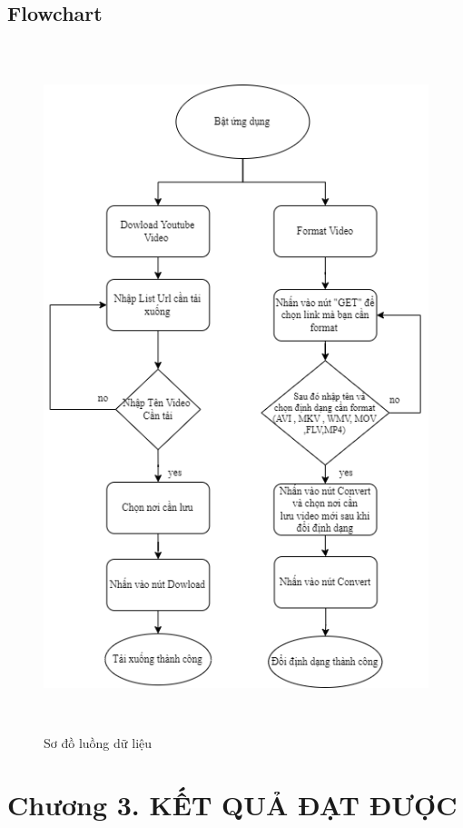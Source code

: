 \documentclass{article} %
\begin{document}
\subsection{Flowchart}
\begin{figure}[H]
    \centering
    \includegraphics[height=20cm]{images/flowchart.png}
    \caption{Sơ đồ luồng dữ liệu}
    \label{fig:enter-label}
\end{figure}
\newpage

\section*{Chương 3. KẾT QUẢ ĐẠT ĐƯỢC}
\setcounter{section}{3}
\setcounter{subsection}{0}
\end{document}
